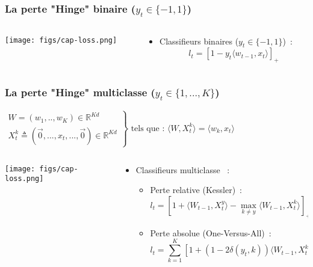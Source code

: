 \documentclass{beamer}
\begin{document}
	

\begin{frame}
	\frametitle{La perte "Hinge" binaire ($y_t \in \{-1,1\}$)}
	\begin{columns}
		\begin{column}{.2 \linewidth}
			\centerline{\texttt{[image: figs/cap-loss.png]}}
		\end{column}
		\begin{column}{.8 \linewidth}
			\begin{itemize}
				\item Classifieurs binaires ($y_t \in \{-1,1\}$)~:
				$$ l_t = \left[1 - y_t \langle w_{t-1}, x_t \rangle \right]_+$$
			
			\end{itemize}
		\end{column}		
	\end{columns}
\end{frame}

\begin{frame}
	\frametitle{La perte "Hinge" multiclasse ($y_t \in \{1,...,K\}$)}
		\begin{exampleblock}{}
			$
			\left.
			\begin{array}{l}
			W = (w_1,..,w_K) \in \mathbb{R}^{K d}\\
			X_t^k \triangleq (\vec{0}, ...,  x_t, ..., \vec{0}) \in \mathbb{R}^{K d}
			\end{array}
			\right\}
			\text{ tels que : }
			\langle W, X^k_t\rangle = \langle w_k, x_t\rangle
			$
			
		\end{exampleblock}
		
	\begin{columns}
		\begin{column}{.2 \linewidth}
			\centerline{\texttt{[image: figs/cap-loss.png]}}
		\end{column}
		\begin{column}{.8 \linewidth}
			\begin{itemize}
				\item Classifieurs multiclasse ~:
				\begin{itemize}
					\item Perte relative (Kessler)~:
					$$l_t =  \left[ 1 +  \langle W_{t-1}, X_t^y \rangle - \max_{k \neq y} \langle W_{t-1}, X_t^k\rangle\right]_+$$
					\item Perte absolue (One-Versus-All)~:
					$$l_t = \sum_{k=1}^K \left[1 + (1 - 2 \delta(y_t,k)) \langle W_{t-1}, X_t^k\rangle\right]_+$$
					
				\end{itemize}
			\end{itemize}
		\end{column}		
	\end{columns}
\end{frame}
\end{document}
